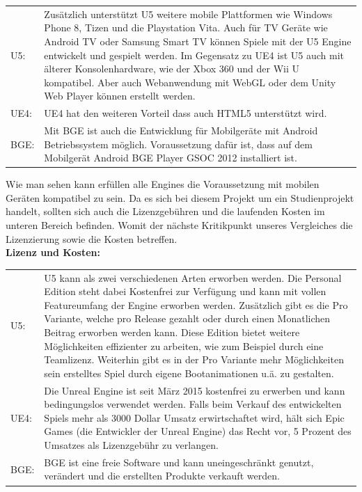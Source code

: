 \begin{table}[H]
\centering
\renewcommand{\arraystretch}{1.5}
\begin{tabular}{lp{14.5cm}}
\ac{U5}:  & Zusätzlich unterstützt \ac{U5} weitere mobile Plattformen wie Windows Phone 8, Tizen und die Playstation Vita. Auch für TV Geräte wie Android TV oder Samsung Smart TV können Spiele mit der \ac{U5} Engine entwickelt und gespielt werden. Im Gegensatz zu \ac{UE4} ist \ac{U5} auch mit älterer Konsolenhardware, wie der Xbox 360 und der Wii U kompatibel. Aber auch Webanwendung mit WebGL oder dem Unity Web Player können erstellt werden. \\

\ac{UE4}: & \ac{UE4} hat den weiteren Vorteil dass auch HTML5 unterstützt wird. \\

\ac{BGE}:     & Mit \ac{BGE} ist auch die Entwicklung für Mobilgeräte mit Android Betriebssystem möglich. Voraussetzung dafür ist, dass auf dem Mobilgerät Android \ac{BGE} Player GSOC 2012 installiert ist. 
\end{tabular}
\end{table}

Wie man sehen kann erfüllen alle Engines die Voraussetzung mit mobilen Geräten kompatibel zu sein. Da es sich bei diesem Projekt um ein Studienprojekt handelt, sollten sich auch die Lizenzgebühren und die laufenden Kosten im unteren Bereich befinden. Womit der nächste Kritikpunkt unseres Vergleiches die Lizenzierung sowie die Kosten betreffen. \\



\textbf{Lizenz und Kosten:}
\begin{table}[H]
\centering
\renewcommand{\arraystretch}{1.5}
\begin{tabular}{lp{14.5cm}}
\ac{U5}: & \ac{U5} kann als zwei verschiedenen Arten erworben werden. Die Personal Edition steht dabei Kostenfrei zur Verfügung und kann mit vollen Featureumfang der Engine erworben werden. Zusätzlich gibt es die Pro Variante, welche pro Release gezahlt oder durch einen Monatlichen Beitrag erworben werden kann. Diese Edition bietet weitere Möglichkeiten effizienter zu arbeiten, wie zum Beispiel durch eine Teamlizenz. Weiterhin gibt es in der Pro Variante mehr Möglichkeiten sein erstelltes Spiel durch eigene Bootanimationen u.ä. zu gestalten.\\
UE4:& Die Unreal Engine ist seit März 2015 kostenfrei zu erwerben und kann bedingungslos verwendet werden. Falls beim Verkauf des entwickelten Spiels mehr als 3000 Dollar Umsatz erwirtschaftet wird, hält sich Epic Games (die Entwickler der Unreal Engine) das Recht vor, 5 Prozent des Umsatzes als Lizenzgebühr zu  verlangen.\\
\ac{BGE}: & \ac{BGE} ist eine freie Software  und kann uneingeschränkt genutzt, verändert und die erstellten Produkte verkauft werden.
\end{tabular}
\end{table}

